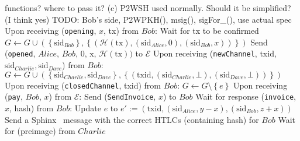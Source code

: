 \begin{algorithmic}[1]
    functions? where to pass it? (c) P2WSH used normally. Should it be simplified? (I
    think yes)
    \State TODO: Bob's side, P2WPKH(), msig(), sigFor\_(), use actual spec
    \State
    \State Upon receiving (\texttt{opening}, $x$, tx) from $Bob$:
      \State Wait for tx to be confirmed
      \State $G \leftarrow G \cup \left(\left\{\mathrm{sid}_{Bob}\right\},
      \left\{\left(\mathcal{H}\left(\mathrm{tx}\right), \left(\mathrm{sid}_{Alice},
      0\right), \left(\mathrm{sid}_{Bob}, x\right)\right)\right\}\right)$ 
      \State Send (\texttt{opened}, $Alice$, $Bob$, 0, x,
      $\mathcal{H}\left(\mathrm{tx}\right))$ to $\mathcal{E}$
    \State
    \State Upon receiving (\texttt{newChannel}, txid, $\mathrm{sid}_{Charlie},
    \mathrm{sid}_{Dave}$) from $Bob$:
        \State $G \leftarrow G \cup \left(\left\{\mathrm{sid}_{Charlie},
        \mathrm{sid}_{Dave}\right\}, \left\{\left(\mathrm{txid},
        \left(\mathrm{sid}_{Charlie}, \bot\right), \left(\mathrm{sid}_{Dave},
        \bot\right)\right)\right\}\right)$ 
      \EndIf
    \State
    \State Upon receiving (\texttt{closedChannel}, txid) from $Bob$:
        \State $G \leftarrow G \setminus \left\{e\right\}$
      \EndIf
    \State
    \State Upon receiving (\texttt{pay}, $Bob$, $x$) from $\mathcal{E}$:
      \State Send (\texttt{SendInvoice}, $x$) to $Bob$
      \State Wait for response (\texttt{invoice}, $x$, hash) from $Bob$:
        \State Update $e$ to $e' := \left(\mathrm{txid},
        \left(\mathrm{sid}_{Alice}, y - x\right),
        \left(\mathrm{sid}_{Bob}, z + x\right)\right)$ 
        \State Send a Sphinx~\cite{sphinx} message with the correct HTLCs (containing
        hash) for $Bob$
        \State {}
        \State Wait for (preimage) from $Charlie$

\end{algorithmic}

